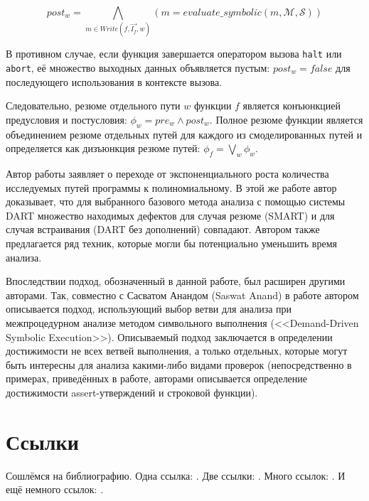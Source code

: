 \begin{equation*}
 post_w = \bigwedge_{m \in Write(f, \overrightarrow{I_f}, w)}(m = evaluate\_symbolic(m, \mathcal{M}, \mathcal{S}))
\end{equation*}

В противном случае, если функция завершается оператором вызова \texttt{halt} или \texttt{abort}, её множество выходных данных объявляется пустым: $post_w = false$ для последующего использования в контексте вызова.

Следовательно, резюме отдельного пути $w$ функции $f$ является конъюнкцией предусловия и постусловия: $\phi_w = pre_w \wedge post_w$. Полное резюме функции является объединением резюме отдельных путей для каждого из смоделированных путей и определяется как дизъюнкция резюме путей: $\phi_f = \bigvee_w \phi_w$.

Автор работы заявляет о переходе от экспоненциального роста количества исследуемых путей программы к полиномиальному. В этой же работе автор доказывает, что для выбранного базового метода анализа с помощью системы DART множество находимых дефектов для случая резюме (SMART) и для случая встраивания (DART без дополнений) совпадают. Автором также предлагается ряд техник, которые могли бы потенциально уменьшить время анализа.

Впоследствии подход, обозначенный в данной работе, был расширен другими авторами. Так, совместно с Сасватом Анандом (Saswat Anand) в работе \cite{anand-godefroid} автором описывается подход, использующий выбор ветви для анализа при межпроцедурном анализе методом символьного выполнения (<<Demand-Driven Symbolic Execution>>). Описываемый подход заключается в определении достижимости не всех ветвей выполнения, а только отдельных, которые могут быть интересны для анализа какими-либо видами проверок (непосредственно в примерах, приведённых в работе, авторами описывается определение достижимости assert-утверждений и строковой функции).



\section{Ссылки} \label{sect1_2}
Сошлёмся на библиографию. Одна ссылка: \cite[с.~54]{Sokolov}\cite[с.~36]{Gaidaenko}. Две ссылки: \cite{Sokolov,Gaidaenko}. Много ссылок:  \cite[с.~54]{Lermontov,Management,Borozda} \cite{Lermontov,Management,Borozda,Marketing,Constitution,FamilyCode,Gost.7.0.53,Razumovski,Lagkueva,Pokrovski,Sirotko,Lukina,Methodology,Encyclopedia,Nasirova,Berestova,Kriger}. И ещё немного ссылок: \cite{Article,Book,Booklet,Conference,Inbook,Incollection,Manual,Mastersthesis,Misc,Phdthesis,Proceedings,Techreport,Unpublished}. \cite{medvedev2006jelektronnye, CEAT:CEAT581, doi:10.1080/01932691.2010.513279,Gosele1999161,Li2007StressAnalysis, Shoji199895,test:eisner-sample,AB_patent_Pomerantz_1968,iofis_patent1960}

